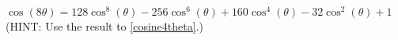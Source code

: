 {$\cos(8\theta) = 128\cos^{8}(\theta)-256\cos^{6}(\theta)+160\cos^{4}(\theta)-32\cos^{2}(\theta)+1$ (HINT:  Use the result to \ref{cosine4theta}.)}
{}
